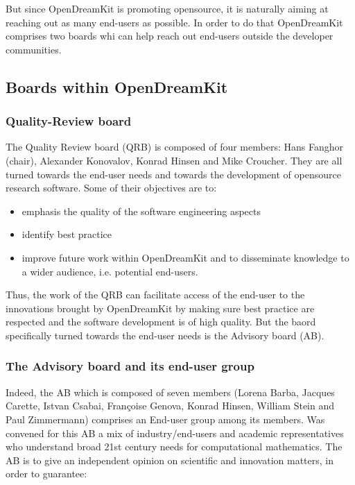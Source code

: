 \documentclass{deliverablereport}
\begin{document}
But since OpenDreamKit is promoting opensource, it is naturally aiming at reaching out as many end-users as possible. In order to do that OpenDreamKit comprises two boards whi can help reach out end-users outside the developer communities.

\subsection{Boards within OpenDreamKit}

\subsubsection{Quality-Review board}

The Quality Review board (QRB) is composed of four members: Hans Fanghor (chair), Alexander Konovalov, Konrad Hinsen and Mike Croucher. They are all turned towards the end-user needs and towards the development of opensource research software.
Some of their objectives are to:

\begin{itemize}
\item{emphasis the quality of the software engineering aspects}
\item{identify best practice}
\item{improve future work within OpenDreamKit and to disseminate knowledge to a wider audience, i.e. potential end-users.}
\end{itemize}
  
Thus, the work of the QRB can facilitate access of the end-user to the innovations brought by OpenDreamKit by making sure best practice are respected and the software development is of high quality. But the baord specifically turned towards the end-user needs is the Advisory board (AB).

\subsubsection{The Advisory board and its end-user group}

Indeed, the AB which is composed of seven members (Lorena Barba, Jacques Carette, Istvan Csabai, Françoise Genova, Konrad Hinsen, William Stein and Paul Zimmermann) comprises an End-user group among its members. Was convened for this AB a mix of industry/end-users and academic representatives who understand broad 21st century needs for computational mathematics.
The AB is to give an independent opinion on scientific and innovation matters, in order to guarantee:
\end{document}
